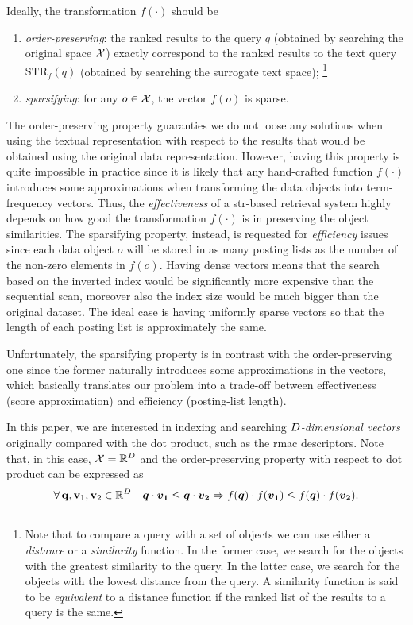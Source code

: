 Ideally, the transformation $f(\cdot)$ should be
\begin{enumerate}
	\item \emph{order-preserving}:  the ranked results to the query $q$ (obtained by searching the original space $\mathcal{X}$) exactly correspond to the ranked results to the text query $\text{STR}_f(q)$ (obtained by searching the surrogate text space);%
\footnote{Note that to compare a query with a set of objects we can use either a \emph{distance} or a \emph{similarity} function.
In the former case, we search for the objects with the greatest similarity to the query.
In the latter case, we search for the objects with the lowest distance from the query. A similarity function is said to be \emph{equivalent} to a distance function if the ranked list of the results to a query is the same.}
	\item \emph{sparsifying}: for any $o \in\mathcal{X}$, the vector $f(o)$ is sparse.
\end{enumerate}

The order-preserving property guaranties we do not loose any solutions when using the textual representation with respect to the results that would be obtained using the original data representation.
However, having this property is quite impossible in practice since it is likely that any hand-crafted function $f(\cdot)$ introduces some approximations when transforming the data objects into term-frequency vectors.
Thus, the \emph{effectiveness} of a \gls{str}-based retrieval system highly depends on how good the transformation $f(\cdot)$ is in preserving the object similarities.
The sparsifying property, instead, is requested for \emph{efficiency} issues since each data object $o$ will be stored in as many posting lists as the number of the non-zero elements in $f(o)$.
Having dense vectors means that the search based on the inverted index would be significantly more expensive than the sequential scan, moreover also the index size would be much bigger than the original dataset.
The ideal case is having uniformly sparse vectors so that the length of each posting list is approximately the same.

Unfortunately, the sparsifying property is in contrast with the order-preserving one since the former naturally introduces some approximations in the vectors, which basically translates our problem into a trade-off between effectiveness (score approximation) and efficiency (posting-list length).

In this paper, we are interested in indexing and searching \emph{${D}$-dimensional vectors} originally compared with the dot product, such as the \gls{rmac} descriptors. Note that, in this case, $\mathcal{X}=\mathbb{R}^{{D}}$ and the order-preserving property with respect to dot product can be expressed as
\begin{equation}
\forall\, \mathbf{q},\mathbf{v}_1,\mathbf{v}_2 \in \mathbb{R}^{{D}} \quad	\boldsymbol {q}\cdot \boldsymbol {v_1} \leq \boldsymbol {q}\cdot \boldsymbol { v_2} \Rightarrow f(\boldsymbol {q})\cdot f(\boldsymbol {v_1}) \leq f(\boldsymbol {q})\cdot f(\boldsymbol {v_2}).
\end{equation}

